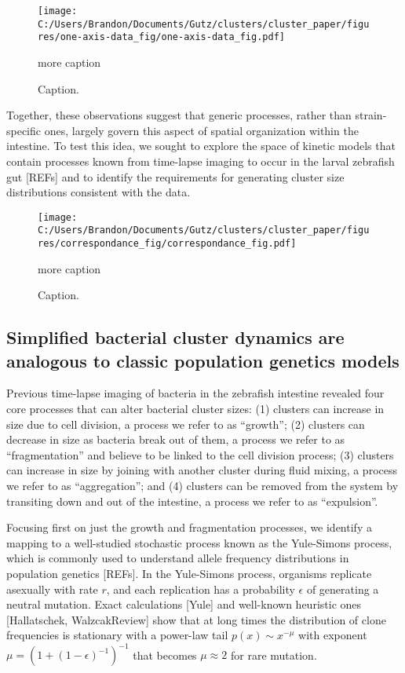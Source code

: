\documentclass[aps,pre,twocolumn]{revtex4-1}
\begin{document}
\begin{figure}%
	\centerline{
		\texttt{[image: C:/Users/Brandon/Documents/Gutz/clusters/cluster\_paper/figures/one-axis-data\_fig/one-axis-data\_fig.pdf]}}
	\caption{Caption.}{more caption}
	\label{fig:one-axis-data-fig}
\end{figure}

Together, these observations suggest that generic processes, rather than strain-specific ones, largely govern this aspect of spatial organization within the intestine. To test this idea, we sought to explore the space of kinetic models that contain processes known from time-lapse imaging to occur in the larval zebrafish gut [REFs] and to identify the requirements for generating cluster size distributions consistent with the data. 

 \begin{figure*}%
	\centerline{
		\texttt{[image: C:/Users/Brandon/Documents/Gutz/clusters/cluster\_paper/figures/correspondance\_fig/correspondance\_fig.pdf]}}
	\caption{Caption.}{more caption}
	\label{fig:correspondance-fig}
\end{figure*}

\subsection{Simplified bacterial cluster dynamics are analogous to classic population genetics models}
Previous time-lapse imaging of bacteria in the zebrafish intestine revealed four core processes that can alter bacterial cluster sizes: (1) clusters can increase in size due to cell division, a process we refer to as ``growth''; (2) clusters can decrease in size as bacteria break out of them, a process we refer to as ``fragmentation'' and believe to be linked to the cell division process; (3) clusters can increase in size by joining with another cluster during fluid mixing, a process we refer to as ``aggregation''; and (4) clusters can be removed from the system by transiting down and out of the intestine, a process we refer to as ``expulsion''.




Focusing first on just the growth and fragmentation processes, we identify a mapping to a well-studied stochastic process known as the Yule-Simons process, which is commonly used to understand allele frequency distributions in population genetics [REFs]. In the Yule-Simons process, organisms replicate asexually with rate $r$, and each replication has a probability $\epsilon$ of generating a neutral mutation. Exact calculations [Yule] and well-known heuristic ones [Hallatschek, WalzcakReview] show that at long times the distribution of clone frequencies is stationary with a power-law tail $p(x) \sim x^{-\mu}$ with exponent $\mu = (1+(1-\epsilon)^{-1})^{-1}$ that becomes $\mu \approx 2$ for rare mutation.
\end{document}
